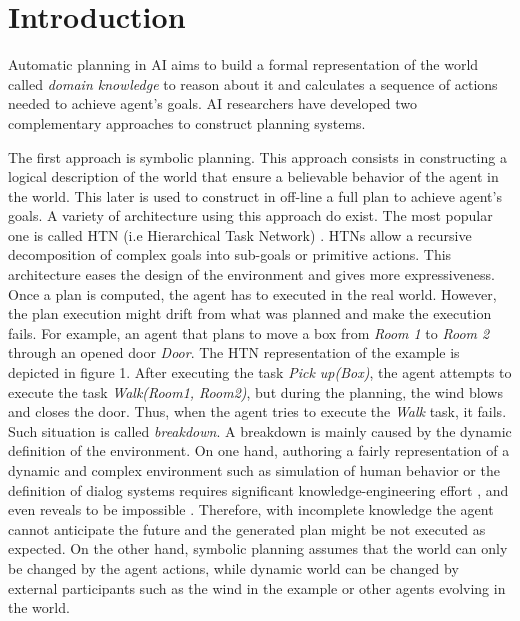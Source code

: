 \documentclass[conference]{IEEEtran}
\begin{document}
	\section{Introduction}
	Automatic planning in AI  aims to build a  formal representation of the world called \emph{domain knowledge} to reason about it and calculates a sequence of actions needed to achieve  agent's goals. AI researchers have developed two complementary approaches to  construct planning systems. 
	\par The first approach is symbolic planning. This approach consists in constructing a logical description of the world that ensure a believable behavior of the agent in the world. This later is used to construct in off-line a full plan to achieve agent's goals.  A variety of architecture using this approach do exist. The most popular one is called HTN (i.e Hierarchical Task Network) \cite{erol1996hierarchical}. HTNs allow a recursive decomposition of complex goals into sub-goals or primitive actions. This architecture eases the design of the environment and gives more expressiveness. Once a plan is computed, the agent has to executed in the real world. However, the plan execution might drift from what was planned and make the execution fails. For example, an agent that plans to move a box from \textit{Room 1} to \textit{Room 2} through an opened door \textit{Door}. The HTN representation of the example is depicted in figure 1. After executing the task \textit{Pick up(Box)}, the agent attempts to execute the task \textit{Walk(Room1, Room2)}, but during the planning, the wind blows and closes the door. Thus, when the agent tries to execute the \textit{Walk} task, it fails. Such situation is called 
	\emph{breakdown}. A breakdown is mainly caused by the dynamic definition of the environment. On one hand, authoring a fairly representation of a dynamic and complex environment such as simulation of human behavior \cite{conte1998mas} or the definition of dialog systems \cite{allen2002human} requires significant  knowledge-engineering effort \cite{zhuo2009learning}, and even reveals to be impossible \cite{maes1990designing}. Therefore, with incomplete knowledge the agent cannot anticipate the future and the generated plan might be not executed as expected. On the other hand, symbolic planning assumes that the world can only be changed by the agent actions, while dynamic world can be changed by external participants such as the wind in the example or other agents evolving in the world.  	  
	
\end{document}
